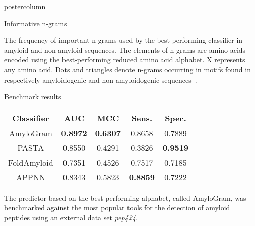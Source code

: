 \documentclass[final]{beamer}
\makeatletter
\def\maxwidth{ %
  \ifdim\Gin@nat@width>\linewidth
    \linewidth
  \else
    \Gin@nat@width
  \fi
}
\newenvironment{knitrout}{}{} %
\newlength{\columnheight}
\makeatother
\begin{document}
\begin{frame}
\begin{columns}
\begin{column}{.48\textwidth}
\begin{beamercolorbox}[center,wd=\textwidth]{postercolumn}
\begin{minipage}[T]{.95\textwidth}  
\parbox[t][\columnheight]{\textwidth}
{




\begin{block}{Informative n-grams}
% 
% 
% 
% 
% 

The frequency of important n-grams used by the best-performing 
classifier in amyloid and non-amyloid sequences. The elements of n-grams are 
amino acids encoded using the best-performing reduced amino acid alphabet. 
X represents any amino acid. Dots and triangles 
denote n-grams occurring in motifs found in respectively amyloidogenic and 
non-amyloidogenic sequences~.

\end{block}
\vfill



\begin{block}{Benchmark results}

\begin{table}[ht]
\centering

\begin{tabular}{ccccc}
  \toprule
Classifier & AUC & MCC & Sens. & Spec. \\ 
  \midrule
AmyloGram & \textbf{0.8972} & \textbf{0.6307} & 0.8658 & 0.7889 \\ 
  \rowcolor{gray!30}PASTA & 0.8550 & 0.4291 & 0.3826 & \textbf{0.9519} \\ 
   FoldAmyloid & 0.7351 & 0.4526 & 0.7517 & 0.7185 \\ 
  \rowcolor{gray!30}APPNN & 0.8343 & 0.5823 & \textbf{0.8859} & 0.7222 \\ 
   \bottomrule
\end{tabular}
\end{table}

The predictor based on the best-performing alphabet, called AmyloGram, was benchmarked against the most popular tools for the detection of amyloid peptides using an external data set \textit{pep424}.

\end{block}
\vfill


}
\end{minipage}
\end{beamercolorbox}
\end{column}
\end{columns}
\end{frame}
\end{document}
